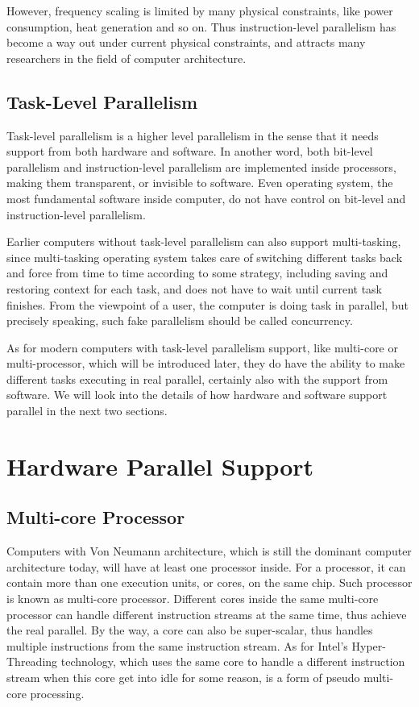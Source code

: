 \documentclass[12pt,a4]{report}
\begin{document}
However, frequency scaling is limited by many physical constraints, like power consumption, heat generation and so on. Thus instruction-level parallelism has become a way out under current physical constraints, and attracts many researchers in the field of computer architecture.

\subsection{Task-Level Parallelism}

Task-level parallelism is a higher level parallelism in the sense that it needs support from both hardware and software. In another word, both bit-level parallelism and instruction-level parallelism are implemented inside processors, making them transparent, or invisible to software. Even operating system, the most fundamental software inside computer, do not have control on bit-level and instruction-level parallelism. 

Earlier computers without task-level parallelism can also support multi-tasking, since multi-tasking operating system takes care of switching different tasks back and force from time to time according to some strategy, including saving and restoring context for each task, and does not have to wait until current task finishes. From the viewpoint of a user, the computer is doing task in parallel, but precisely speaking, such fake parallelism should be called concurrency. 

As for modern computers with task-level parallelism support, like multi-core or multi-processor, which will be introduced later, they do have the ability to make different tasks executing in real parallel, certainly also with the support from software. We will look into the details of how hardware and software support parallel in the next two sections.

\section{Hardware Parallel Support}

\subsection{Multi-core Processor}

Computers with Von Neumann architecture, which is still the dominant computer architecture today, will have at least one processor inside. For a processor, it can contain more than one execution units, or cores, on the same chip. Such processor is known as multi-core processor. Different cores inside the same multi-core processor can handle different instruction streams at the same time, thus achieve the real parallel. By the way, a core can also be super-scalar, thus handles multiple instructions from the same instruction stream. As for Intel's Hyper-Threading technology, which uses the same core to handle a different instruction stream when this core get into idle for some reason, is a form of pseudo multi-core processing.
\end{document}

